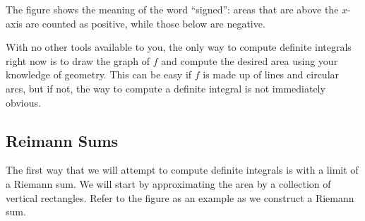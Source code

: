 The figure shows the meaning of the word ``signed'': areas that are above the $x$-axis are counted as positive, while those below are negative.

With no other tools available to you, the only way to compute definite integrals right now is to draw the graph of $f$ and compute the desired area using your knowledge of geometry.  This can be easy if $f$ is made up of lines and circular arcs, but if not, the way to compute a definite integral is not immediately obvious.

\subsection{Reimann Sums}

The first way that we will attempt to compute definite integrals is with a limit of a Riemann sum. We will start by approximating the area by a collection of vertical rectangles. Refer to the figure as an example as we construct a Riemann sum.

